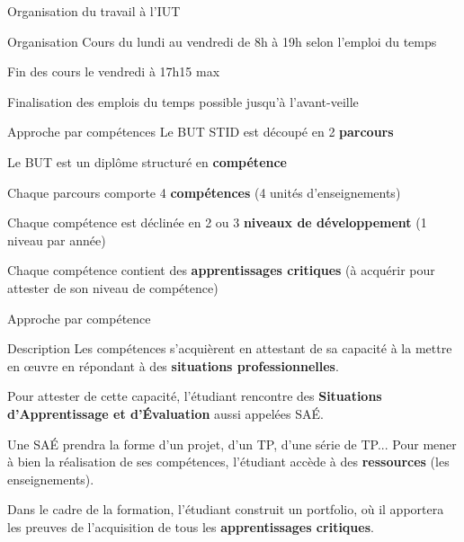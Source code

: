 \documentclass [xcolor=x11names,t] {beamer}
\begin{document}
\begin{frame}{Organisation du travail à l’IUT}

\begin{block}{Organisation}
    Cours du lundi au vendredi de 8h à 19h selon l’emploi du temps
    
Fin des cours le vendredi à 17h15 max

Finalisation des emplois du temps possible jusqu’à l’avant-veille    
\end{block}

\begin{block}{ Approche par compétences}
    Le BUT STID est découpé en 2 \textbf{parcours}

Le BUT est un diplôme structuré en \textbf{compétence}

Chaque parcours comporte 4 \textbf{compétences} (4 unités d’enseignements)

Chaque compétence est déclinée en 2 ou 3 \textbf{niveaux de développement} (1 niveau par année)

Chaque compétence contient des \textbf{apprentissages critiques} (à acquérir pour attester de son niveau de compétence)
\end{block}

\end{frame}


\begin{frame}{Approche par compétence}
	\begin{block}{Description}
	Les compétences s’acquièrent en attestant de sa capacité à la mettre en œuvre en répondant à des \textbf{situations professionnelles}.
	
	Pour attester de cette capacité, l’étudiant rencontre des \textbf{Situations d’Apprentissage et 
	d’Évaluation} aussi appelées SAÉ.
	
	Une SAÉ prendra la forme d’un projet, d’un TP, d’une série de TP...
	Pour mener à bien la réalisation de ses compétences, l’étudiant accède à des \textbf{ressources} (les enseignements).
	
	
	Dans le cadre de la formation, l’étudiant construit un portfolio, où il apportera les preuves de l’acquisition de tous les \textbf{apprentissages critiques}.
	\end{block}
	
\end{frame}
\end{document}
